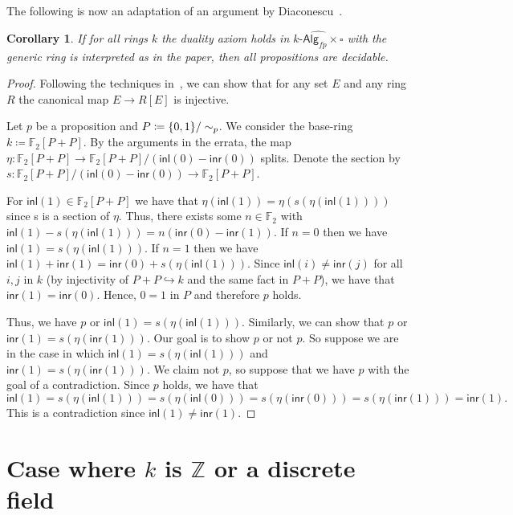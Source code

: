 \documentclass[10pt,a4paper]{article}
\newtheorem{corollary}{Corollary}[section]
\newcommand{\ints}{\mathbb{Z}}
\newcommand{\Alg}{\mathsf{Alg}}
\newcommand\inl{\mathsf{inl}}
\newcommand\inr{\mathsf{inr}}
\DeclarePairedDelimiter\set{\{}{\}}
\begin{document}
The following is now an adaptation of an argument by Diaconescu~\cite{diaconescu1975choice}.

\begin{corollary}
  If for all rings \(k\) the duality axiom holds in \(\widehat{k\text{-}\Alg_{fp} \times \square}\) with the generic ring is interpreted as in the paper, then all propositions are decidable.
\end{corollary}
\begin{proof}
  Following the techniques in~\cite{mines}, we can show that for any set $E$ and any ring $R$ the canonical map $E \to R[E]$ is injective.

  Let $p$ be a proposition and $P \coloneqq \set{0,1} / \sim_p$.
  We consider the base-ring $k \coloneqq \mathbb{F}_2[P + P]$.
  By the arguments in the errata, the map $\eta \colon \mathbb{F}_2[P + P] \to \mathbb{F}_2[P + P] / (\inl(0) - \inr(0))$ splits.
  Denote the section by $s : \mathbb{F}_2[P + P] / (\inl(0) - \inr(0)) \to \mathbb{F}_2[P + P]$.

  For $\inl(1) \in \mathbb{F}_2[P + P]$ we have that $\eta(\inl(1)) = \eta(s(\eta(\inl(1))))$ since s is a section of $\eta$.
  Thus, there exists some $n \in \mathbb{F}_2$ with $\inl(1) - s(\eta(\inl(1))) = n(\inr(0) - \inr(1))$.
  If $n = 0$ then we have $\inl(1) = s(\eta(\inl(1)))$.
  If $n = 1$ then we have $\inl(1) + \inr(1) = \inr(0) + s(\eta(\inl(1)))$.
  Since $\inl(i) \ne \inr(j)$ for all $i, j$ in $k$ (by injectivity of $P + P \hookrightarrow k$ and the same fact in $P + P$), we have that $\inr(1) = \inr(0)$.
  Hence, $0 = 1$ in $P$ and therefore $p$ holds.

  Thus, we have $p$ or $\inl(1) = s(\eta(\inl(1)))$.
  Similarly, we can show that $p$ or $\inr(1) = s(\eta(\inr(1)))$.
  Our goal is to show $p$ or not $p$.
  So suppose we are in the case in which $\inl(1) = s(\eta(\inl(1)))$ and $\inr(1) = s(\eta(\inr(1)))$.
  We claim not $p$, so suppose that we have $p$ with the goal of a contradiction.
  Since $p$ holds, we have that
  \[
    \inl(1) = s(\eta(\inl(1))) = s(\eta(\inl(0))) = s(\eta(\inr(0))) = s(\eta(\inr(1))) = \inr(1).
  \]
  This is a contradiction since $\inl(1) \ne \inr(1)$.
\end{proof}


\section{Case where $k$ is $\ints$ or a discrete field}
\end{document}
